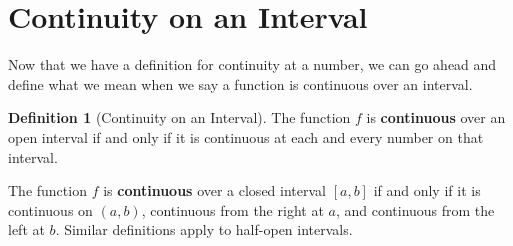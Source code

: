\documentclass[12pt,]{book}
\newcommand{\terminology}[1]{\textbf{#1}}
\theoremstyle{plain}
\theoremstyle{definition}
\newtheorem{definition}[theorem]{Definition}
\theoremstyle{definition}
\theoremstyle{definition}
\theoremstyle{definition}
\theoremstyle{definition}
\numberwithin{equation}{section}
\newcommand{\cinterval}[2]{\left[#1,#2\right]}
\newcommand{\ointerval}[2]{\left(#1,#2\right)}
\begin{document}
\section[{Continuity on an Interval}]{Continuity on an Interval}\label{section-continuity-on-an-interval}
Now that we have a definition for continuity at a number, we can go ahead and define what we mean when we say a function is continuous over an interval.%
\begin{definition}[{Continuity on an Interval}]\label{definition-continuity-on-an-interval}
The function \(f\) is \terminology{continuous} over an open interval if and only if it is continuous at each and every number on that interval.%
\par
The function \(f\) is \terminology{continuous} over a closed interval \(\cinterval{a}{b}\) if and only if it is continuous on \(\ointerval{a}{b}\), continuous from the right at \(a\), and continuous from the left at \(b\). Similar definitions apply to half-open intervals.%
\end{definition}
\typeout{************************************************}
\typeout{************************************************}
\end{document}
